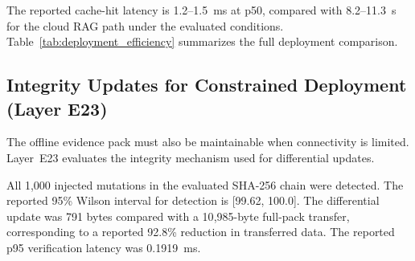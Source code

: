 \documentclass[a4paper,fleqn]{cas-dc}
\begin{document}
The reported cache-hit latency is 1.2--1.5~ms at p50, compared with 8.2--11.3~s for the cloud RAG path under the evaluated conditions. Table~\ref{tab:deployment_efficiency} summarizes the full deployment comparison.


\begin{table}[pos=t]
\centering
\caption{Deployment performance under constrained channels (Layers E14, E15, E18, E20, E23).}
\label{tab:deployment_efficiency}
\small
{}
\end{table}


\subsection{Integrity Updates for Constrained Deployment (Layer E23)}

The offline evidence pack must also be maintainable when connectivity is limited. Layer~E23 evaluates the integrity mechanism used for differential updates.

All 1{,}000 injected mutations in the evaluated SHA-256 chain were detected. The reported 95\% Wilson interval for detection is [99.62, 100.0]. The differential update was 791 bytes compared with a 10{,}985-byte full-pack transfer, corresponding to a reported 92.8\% reduction in transferred data. The reported p95 verification latency was 0.1919~ms.
\end{document}
